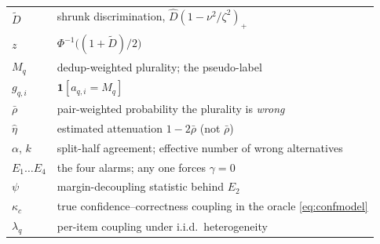\documentclass[twoside,11pt]{article}
\newcommand{\Dhat}{\widehat{D}}
\begin{document}
\begin{table}[h]
\begin{tabular}{@{}l p{5.55cm}@{}}
$\tilde D$ & shrunk discrimination, $\Dhat(1-\nu^2/\zeta^2)_+$ \\
$z$ & $\Phi^{-1}\!\big((1+\tilde D)/2\big)$ \\
\midrule
$M_q$ & dedup-weighted plurality; the pseudo-label \\
$g_{q,i}$ & $\mathbf{1}[a_{q,i}=M_q]$ \\
$\bar\rho$ & pair-weighted probability the plurality is \emph{wrong} \\
$\hat\eta$ & estimated attenuation $1-2\bar\rho$ (not $\bar\rho$) \\
$\alpha$, $k$ & split-half agreement; effective number of wrong alternatives \\
$E_1\ldots E_4$ & the four alarms; any one forces $\gamma=0$ \\
$\psi$ & margin-decoupling statistic behind $E_2$ \\
\midrule
$\kappa_c$ & true confidence--correctness coupling in the oracle \eqref{eq:confmodel} \\
$\lambda_q$ & per-item coupling under i.i.d.\ heterogeneity \\
\bottomrule
\end{tabular}
\end{table}
\endgroup



\end{document}
